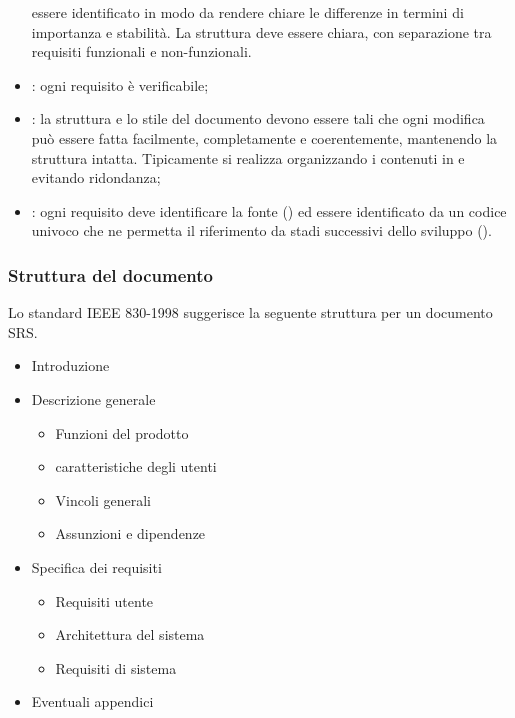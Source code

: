 \begin{itemize}
    essere identificato in modo da rendere chiare le differenze in termini di
    importanza e stabilità. La struttura deve essere chiara, con separazione
    tra requisiti funzionali e non-funzionali.
  \item {}: ogni requisito è verificabile;
  \item {}: la struttura e lo stile del documento devono
    essere tali che ogni modifica può essere fatta facilmente, completamente e
    coerentemente, mantenendo la struttura intatta. Tipicamente si realizza
    organizzando i contenuti in  e evitando
    ridondanza;
  \item {}: 
    ogni requisito deve identificare la fonte ()
    ed essere identificato da un codice univoco che ne permetta il riferimento
    da stadi successivi dello sviluppo ().
\end{itemize}

\subsubsection{Struttura del documento}
\label{ssub:struttura_del_documento}

Lo standard IEEE 830-1998 suggerisce la seguente struttura per un documento SRS.

\begin{itemize}
  \item Introduzione
  \item Descrizione generale
    \begin{itemize}
      \item Funzioni del prodotto
      \item caratteristiche degli utenti
      \item Vincoli generali
      \item Assunzioni e dipendenze
    \end{itemize}
  \item Specifica dei requisiti
    \begin{itemize}
      \item Requisiti utente
      \item Architettura del sistema
      \item Requisiti di sistema
    \end{itemize}
  \item Eventuali appendici
\end{itemize}

